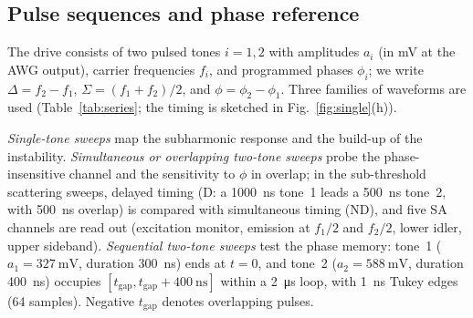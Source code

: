 \documentclass[aps,prb,reprint,superscriptaddress,floatfix]{revtex4-2}
\newcommand{\tgap}{t_{\mathrm{gap}}}
\begin{document}
\subsection{Pulse sequences and phase reference}\label{sec:pulses}

The drive consists of two pulsed tones $i=1,2$ with amplitudes $a_i$ (in mV at the AWG output), carrier frequencies $f_i$, and programmed phases $\phi_i$; we write $\Delta=f_2-f_1$, $\Sigma=(f_1+f_2)/2$, and $\phi=\phi_2-\phi_1$. Three families of waveforms are used (Table~\ref{tab:series}; the timing is sketched in Fig.~\ref{fig:single}(h)).

\emph{Single-tone sweeps} map the subharmonic response and the build-up of the instability. \emph{Simultaneous or overlapping two-tone sweeps} probe the phase-insensitive channel and the sensitivity to $\phi$ in overlap; in the sub-threshold scattering sweeps, delayed timing (D: a \SI{1000}{\nano\second} tone~1 leads a \SI{500}{\nano\second} tone~2, with \SI{500}{\nano\second} overlap) is compared with simultaneous timing (ND), and five SA channels are read out (excitation monitor, emission at $f_1/2$ and $f_2/2$, lower idler, upper sideband). \emph{Sequential two-tone sweeps} test the phase memory: tone~1 ($a_1=\SI{327}{\milli\volt}$, duration \SI{300}{\nano\second}) ends at $t=0$, and tone~2 ($a_2=\SI{588}{\milli\volt}$, duration \SI{400}{\nano\second}) occupies $[\tgap,\tgap+\SI{400}{\nano\second}]$ within a \SI{2}{\micro\second} loop, with \SI{1}{\nano\second} Tukey edges (64 samples). Negative $\tgap$ denotes overlapping pulses.
\end{document}
